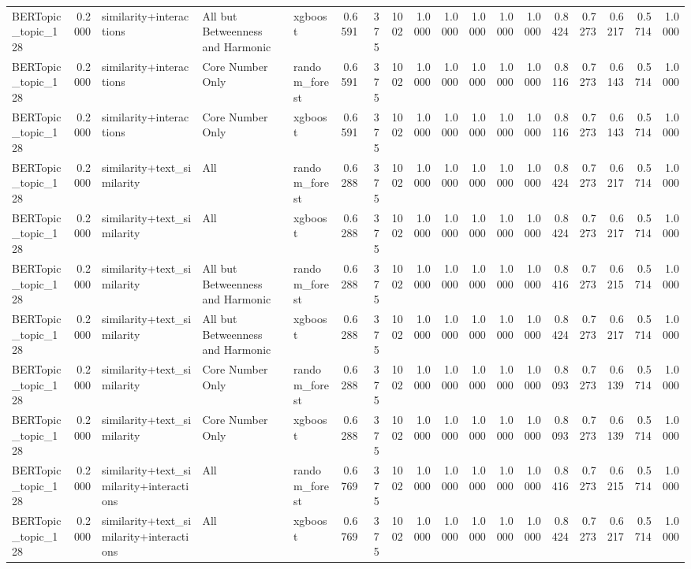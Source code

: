 \begin{tabular}{lrlllrrrrrrrrrrrrr}
BERTopic_topic_128 & 0.2000 & similarity+interactions & All but Betweenness and Harmonic & xgboost & 0.6591 & 375 & 1002 & 1.0000 & 1.0000 & 1.0000 & 1.0000 & 1.0000 & 0.8424 & 0.7273 & 0.6217 & 0.5714 & 1.0000 \\
BERTopic_topic_128 & 0.2000 & similarity+interactions & Core Number Only & random_forest & 0.6591 & 375 & 1002 & 1.0000 & 1.0000 & 1.0000 & 1.0000 & 1.0000 & 0.8116 & 0.7273 & 0.6143 & 0.5714 & 1.0000 \\
BERTopic_topic_128 & 0.2000 & similarity+interactions & Core Number Only & xgboost & 0.6591 & 375 & 1002 & 1.0000 & 1.0000 & 1.0000 & 1.0000 & 1.0000 & 0.8116 & 0.7273 & 0.6143 & 0.5714 & 1.0000 \\
BERTopic_topic_128 & 0.2000 & similarity+text_similarity & All & random_forest & 0.6288 & 375 & 1002 & 1.0000 & 1.0000 & 1.0000 & 1.0000 & 1.0000 & 0.8424 & 0.7273 & 0.6217 & 0.5714 & 1.0000 \\
BERTopic_topic_128 & 0.2000 & similarity+text_similarity & All & xgboost & 0.6288 & 375 & 1002 & 1.0000 & 1.0000 & 1.0000 & 1.0000 & 1.0000 & 0.8424 & 0.7273 & 0.6217 & 0.5714 & 1.0000 \\
BERTopic_topic_128 & 0.2000 & similarity+text_similarity & All but Betweenness and Harmonic & random_forest & 0.6288 & 375 & 1002 & 1.0000 & 1.0000 & 1.0000 & 1.0000 & 1.0000 & 0.8416 & 0.7273 & 0.6215 & 0.5714 & 1.0000 \\
BERTopic_topic_128 & 0.2000 & similarity+text_similarity & All but Betweenness and Harmonic & xgboost & 0.6288 & 375 & 1002 & 1.0000 & 1.0000 & 1.0000 & 1.0000 & 1.0000 & 0.8424 & 0.7273 & 0.6217 & 0.5714 & 1.0000 \\
BERTopic_topic_128 & 0.2000 & similarity+text_similarity & Core Number Only & random_forest & 0.6288 & 375 & 1002 & 1.0000 & 1.0000 & 1.0000 & 1.0000 & 1.0000 & 0.8093 & 0.7273 & 0.6139 & 0.5714 & 1.0000 \\
BERTopic_topic_128 & 0.2000 & similarity+text_similarity & Core Number Only & xgboost & 0.6288 & 375 & 1002 & 1.0000 & 1.0000 & 1.0000 & 1.0000 & 1.0000 & 0.8093 & 0.7273 & 0.6139 & 0.5714 & 1.0000 \\
BERTopic_topic_128 & 0.2000 & similarity+text_similarity+interactions & All & random_forest & 0.6769 & 375 & 1002 & 1.0000 & 1.0000 & 1.0000 & 1.0000 & 1.0000 & 0.8416 & 0.7273 & 0.6215 & 0.5714 & 1.0000 \\
BERTopic_topic_128 & 0.2000 & similarity+text_similarity+interactions & All & xgboost & 0.6769 & 375 & 1002 & 1.0000 & 1.0000 & 1.0000 & 1.0000 & 1.0000 & 0.8424 & 0.7273 & 0.6217 & 0.5714 & 1.0000 \\

\end{tabular}
